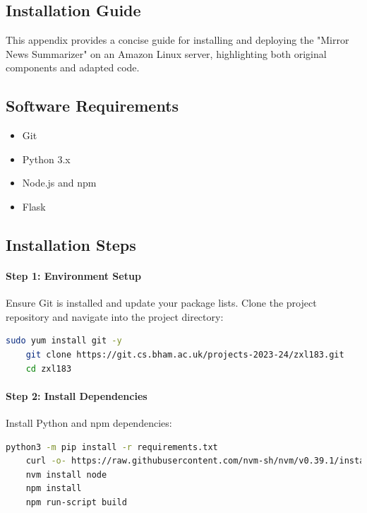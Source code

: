 \documentclass[10pt]{article}
\begin{document}
\begin{appendices}
    \section{Installation Guide}
    \label{sec:installation_guide}
    
    This appendix provides a concise guide for installing and deploying the "Mirror News Summarizer" on an Amazon Linux server, highlighting both original components and adapted code.
    
    \subsection{Software Requirements}
    \begin{itemize}
        \item Git
        \item Python 3.x
        \item Node.js and npm
        \item Flask
    \end{itemize}
    
    \subsection{Installation Steps}
    
    \paragraph{Step 1: Environment Setup}
    Ensure Git is installed and update your package lists. Clone the project repository and navigate into the project directory:
    \begin{lstlisting}[language=bash]
    sudo yum install git -y
    git clone https://git.cs.bham.ac.uk/projects-2023-24/zxl183.git
    cd zxl183
    \end{lstlisting}
    
    \paragraph{Step 2: Install Dependencies}
    Install Python and npm dependencies:
    \begin{lstlisting}[language=bash]
    python3 -m pip install -r requirements.txt
    curl -o- https://raw.githubusercontent.com/nvm-sh/nvm/v0.39.1/install.sh | bash
    nvm install node
    npm install
    npm run-script build
    \end{lstlisting}
    

\end{appendices}
\end{document}
